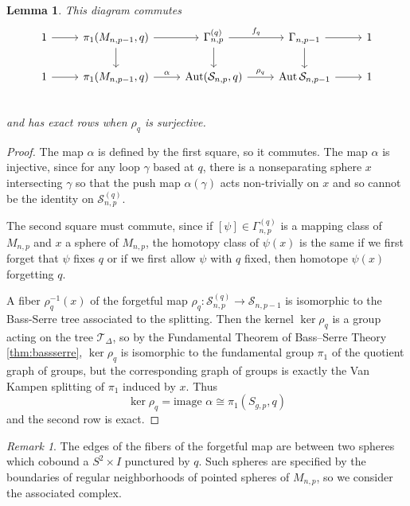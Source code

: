 \documentclass[11pt]{article}
\DeclareMathOperator{\aaut}{Aut}
\newtheorem{lemma}[theorem]{Lemma}
\theoremstyle{remark}
\newtheorem{remark}[theorem]{Remark}
\theoremstyle{definition}
\begin{document}
\begin{lemma}
  This diagram commutes
  $$
  \begin{tikzcd}
  1 \arrow[r]&
  \pi_1(M_{n,p-1},q) \arrow[r] \arrow[d]&
  \Gamma_{n,p}^{(q)}  \arrow{r}{f_q} \arrow[d]&
  \Gamma_{n,p-1} \arrow[r] \arrow[d]&
  1 \\
  1 \arrow[r]&
  \pi_1(M_{n,p-1},q) \arrow{r}{\alpha}&
  \aaut (\mathcal S_{n,p}, q)  \arrow{r}{\rho_{q}}&
  \aaut \mathcal S_{n,p-1} \arrow{r}&
  1 \\
  \end{tikzcd}
  $$
  and has exact rows when $\rho_{q}$ is surjective.
  \label{lemma:exact}
\end{lemma}

\begin{proof}
  The map $\alpha$ is defined by the first square, so it commutes.
  The map $\alpha$ is injective, since
  for any loop $\gamma$ based at $q$,
  there is a nonseparating sphere $x$ intersecting $\gamma$
  so that the push map $\alpha(\gamma)$ acts non-trivially on $x$ and so cannot be the identity on $\mathcal S_{n,p}^{(q)}$.

  The second square must commute,
  since if $[\psi] \in \Gamma_{n,p}^{(q)}$
  is a mapping class of $M_{n,p}$ and $x$ a sphere of $M_{n,p}$,
  the homotopy class of $\psi(x)$ is the same if we first
  forget that $\psi$ fixes $q$ or if we first allow $\psi$ with
  $q$ fixed, then homotope $\psi(x)$ forgetting $q$.

  A fiber $\rho^{-1}_q(x)$ of the forgetful map
  $\rho_q: \mathcal  S_{n,p}^{(q)} \to \mathcal  S_{n,p-1}$
  is isomorphic to the Bass-Serre tree associated to the splitting.
  Then the kernel $\ker \rho_{q}$ is a
  group acting on the tree $\mathcal T_\Delta$,
  so by the
  Fundamental Theorem of Bass–Serre Theory
  \ref{thm:bassserre},
  $\ker \rho_{q}$ is isomorphic to
  the fundamental group $\pi_1$ of the
  quotient graph of groups,
  but the corresponding graph of groups is
  exactly the Van Kampen splitting of $\pi_1$ induced by $x$.
  Thus
  $$\ker \rho_{q} = \mbox{image } \alpha \cong \pi_1(S_{g,p},q)$$
  and the second row is exact.
\end{proof}

\begin{remark}
  The edges of the fibers of the forgetful map
  are between two spheres which cobound a
  $S^2 \times I$
  punctured by $q$.
  Such spheres are specified by the boundaries of regular neighborhoods of pointed spheres of $M_{n,p}$,
  so we consider the associated complex.
\end{remark}
\end{document}
